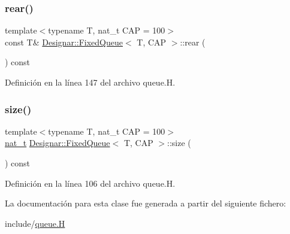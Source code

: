 \subsubsection{\texorpdfstring{rear()}{rear()}\hspace{0.1cm}{\footnotesize\ttfamily [2/2]}}
{\footnotesize\ttfamily template$<$typename T, nat\+\_\+t C\+AP = 100$>$ \\
const T\& \hyperlink{class_designar_1_1_fixed_queue}{Designar\+::\+Fixed\+Queue}$<$ T, C\+AP $>$\+::rear (\begin{DoxyParamCaption}{ }\end{DoxyParamCaption}) const\hspace{0.3cm}{\ttfamily [inline]}}



Definición en la línea 147 del archivo queue.\+H.

\mbox{\label{class_designar_1_1_fixed_queue_a9fa2f855edd54de0c847c8ba35c804cf}} 
\subsubsection{\texorpdfstring{size()}{size()}}
{\footnotesize\ttfamily template$<$typename T, nat\+\_\+t C\+AP = 100$>$ \\
\hyperlink{namespace_designar_aa72662848b9f4815e7bf31a7cf3e33d1}{nat\+\_\+t} \hyperlink{class_designar_1_1_fixed_queue}{Designar\+::\+Fixed\+Queue}$<$ T, C\+AP $>$\+::size (\begin{DoxyParamCaption}{ }\end{DoxyParamCaption}) const\hspace{0.3cm}{\ttfamily [inline]}}



Definición en la línea 106 del archivo queue.\+H.



La documentación para esta clase fue generada a partir del siguiente fichero\+:\begin{DoxyCompactItemize}
\item 
include/\hyperlink{queue_8_h}{queue.\+H}\end{DoxyCompactItemize}
